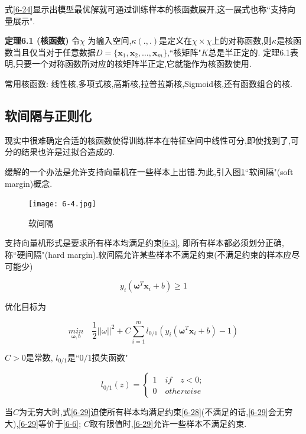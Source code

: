 \documentclass[12pt]{article}
\numberwithin{equation}{section}%
\begin{document}
式\ref{6-24}显示出模型最优解就可通过训练样本的核函数展开,这一展式也称``支持向量展示".

\textbf{定理6.1 (核函数)}  \quad 令$\chi$ 为输入空间,$\kappa(.,.)$是定义在$\chi \times \chi$上的对称函数,则$\kappa$是核函数当且仅当对于任意数据$D=\{\boldsymbol{x}_{1},\boldsymbol{x}_{2},\ldots,\boldsymbol{x}_{m}\}$,``核矩阵"$K$总是半正定的.
 定理6.1表明,只要一个对称函数所对应的核矩阵半正定,它就能作为核函数使用.

常用核函数: 线性核,多项式核,高斯核,拉普拉斯核,Sigmoid核,还有函数组合的核.

\subsection{软间隔与正则化}

现实中很难确定合适的核函数使得训练样本在特征空间中线性可分,即使找到了,可分的结果也许是过拟合造成的.

缓解的一个办法是允许支持向量机在一些样本上出错.为此,引入图\ref{6.4}``软间隔"(soft margin)概念.

\begin{figure}
\centering\texttt{[image: 6-4.jpg]}
\caption{软间隔}
\label{6.4}
\end{figure}

支持向量机形式是要求所有样本均满足约束\ref{6-3}, 即所有样本都必须划分正确,称``硬间隔"(hard margin).软间隔允许某些样本不满足约束(不满足约束的样本应尽可能少)

\begin{equation}
y_{i}(\boldsymbol{\omega}^{T}\boldsymbol{x}_{i}+b) \geqslant 1
\label{6-28}
\end{equation}

优化目标为

\begin{equation}
{\underset{\boldsymbol{\omega},b}{min}} \quad \dfrac{1}{2}||\omega||^{2}+C\sum_{i=1}^{m}l_{0/1}(y_{i}(\boldsymbol{\omega}^{T}\boldsymbol{x}_{i}+b)-1)
\label{6-29}
\end{equation}

$C>0$是常数, $l_{0/1}$是``$0/1$损失函数"

\begin{equation}
l_{0/1}(z)=
 \left\{ \begin{array}{ll}
1 \quad if  \quad z<0;\\
 0 \quad otherwise
\end{array} \right.
\end{equation}

当$C$为无穷大时,式\ref{6-29}迫使所有样本均满足约束\ref{6-28}(不满足的话,\ref{6-29}会无穷大),\ref{6-29}等价于\ref{6-6}; $C$取有限值时,\ref{6-29}允许一些样本不满足约束.
\end{document}
